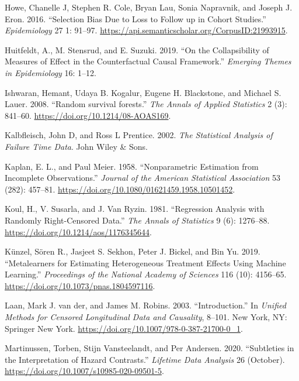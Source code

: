 \documentclass[
  11pt,
  a4paper,
]{article}
\newlength{\cslhangindent}
\newenvironment{CSLReferences}[2] %
 {\begin{list}{}{%
  \setlength{\itemindent}{0pt}
  \setlength{\leftmargin}{0pt}
  \setlength{\parsep}{0pt}
  \ifodd #1
   \setlength{\leftmargin}{\cslhangindent}
   \setlength{\itemindent}{-1\cslhangindent}
  \fi
  \setlength{\itemsep}{#2\baselineskip}}}
 {\end{list}}
\theoremstyle{plain}
\theoremstyle{plain}
\theoremstyle{plain}
\theoremstyle{definition}
\theoremstyle{remark}
\begin{document}
\begin{CSLReferences}{1}{0}
Howe, Chanelle J, Stephen R. Cole, Bryan Lau, Sonia Napravnik, and
Joseph J. Eron. 2016. {``Selection Bias Due to Loss to Follow up in
Cohort Studies.''} \emph{Epidemiology} 27 1: 91--97.
\url{https://api.semanticscholar.org/CorpusID:21993915}.

Huitfeldt, A., M. Stensrud, and E. Suzuki. 2019. {``On the
Collapsibility of Measures of Effect in the Counterfactual Causal
Framework.''} \emph{Emerging Themes in Epidemiology} 16: 1--12.

Ishwaran, Hemant, Udaya B. Kogalur, Eugene H. Blackstone, and Michael S.
Lauer. 2008. {``{Random survival forests}.''} \emph{The Annals of
Applied Statistics} 2 (3): 841--60.
\url{https://doi.org/10.1214/08-AOAS169}.

Kalbfleisch, John D, and Ross L Prentice. 2002. \emph{The Statistical
Analysis of Failure Time Data}. John Wiley \& Sons.

Kaplan, E. L., and Paul Meier. 1958. {``Nonparametric Estimation from
Incomplete Observations.''} \emph{Journal of the American Statistical
Association} 53 (282): 457--81.
\url{https://doi.org/10.1080/01621459.1958.10501452}.

Koul, H., V. Susarla, and J. Van Ryzin. 1981. {``{Regression Analysis
with Randomly Right-Censored Data}.''} \emph{The Annals of Statistics} 9
(6): 1276--88. \url{https://doi.org/10.1214/aos/1176345644}.

Künzel, Sören R., Jasjeet S. Sekhon, Peter J. Bickel, and Bin Yu. 2019.
{``Metalearners for Estimating Heterogeneous Treatment Effects Using
Machine Learning.''} \emph{Proceedings of the National Academy of
Sciences} 116 (10): 4156--65.
\url{https://doi.org/10.1073/pnas.1804597116}.

Laan, Mark J. van der, and James M. Robins. 2003. {``Introduction.''} In
\emph{Unified Methods for Censored Longitudinal Data and Causality},
8--101. New York, NY: Springer New York.
\url{https://doi.org/10.1007/978-0-387-21700-0_1}.

Martinussen, Torben, Stijn Vansteelandt, and Per Andersen. 2020.
{``Subtleties in the Interpretation of Hazard Contrasts.''}
\emph{Lifetime Data Analysis} 26 (October).
\url{https://doi.org/10.1007/s10985-020-09501-5}.


\end{CSLReferences}
\end{document}
